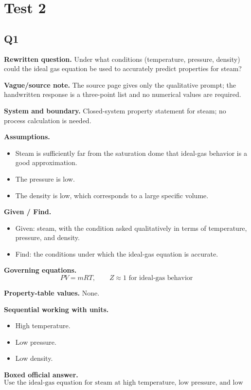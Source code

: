 \section*{Test 2}

\subsection*{Q1}
\textbf{Rewritten question.} Under what conditions (temperature, pressure, density) could the ideal gas equation be used to accurately predict properties for steam?

\textbf{Vague/source note.} The source page gives only the qualitative prompt; the handwritten response is a three-point list and no numerical values are required.

\textbf{System and boundary.} Closed-system property statement for steam; no process calculation is needed.

\textbf{Assumptions.}
\begin{itemize}
  \item Steam is sufficiently far from the saturation dome that ideal-gas behavior is a good approximation.
  \item The pressure is low.
  \item The density is low, which corresponds to a large specific volume.
\end{itemize}

\textbf{Given / Find.}
\begin{itemize}
  \item Given: steam, with the condition asked qualitatively in terms of temperature, pressure, and density.
  \item Find: the conditions under which the ideal-gas equation is accurate.
\end{itemize}

\textbf{Governing equations.}
\[
PV=mRT, \qquad Z\approx 1 \text{ for ideal-gas behavior}
\]

\textbf{Property-table values.} None.

\textbf{Sequential working with units.}
\begin{itemize}
  \item High temperature.
  \item Low pressure.
  \item Low density.
\end{itemize}

\textbf{Boxed official answer.}
\[
\boxed{\text{Use the ideal-gas equation for steam at high temperature, low pressure, and low density.}}
\]


